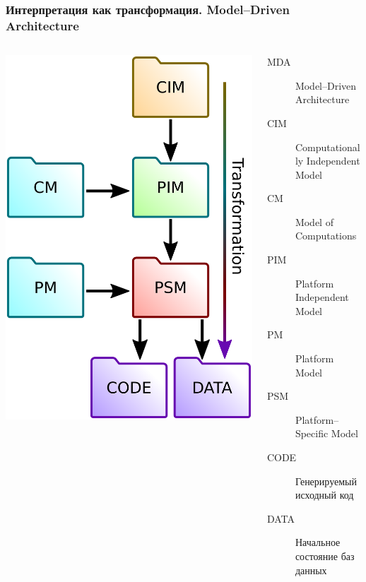 \documentclass[handout]{beamer}
\begin{document}
\begin{frame}[fragile]
  \frametitle{Интерпретация как трансформация. Model--Driven Architecture}
  \begin{columns}
    \begin{column}{0.4\textwidth}
      \includegraphics[width=1\linewidth]{mda-most-general.pdf}
    \end{column}
    \begin{column}{0.7\linewidth}
      \begin{description}
      \item[MDA] Model--Driven Architecture
      \item[CIM] Computationally Independent Model
      \item[CM] Model of Computations
      \item[PIM] Platform Independent Model
      \item[PM] Platform Model
      \item[PSM] Platform--Specific Model
      \item[CODE] Генерируемый исходный код
      \item[DATA] Начальное состояние баз данных
      \end{description}
    \end{column}
  \end{columns}
\end{frame}
\end{document}
